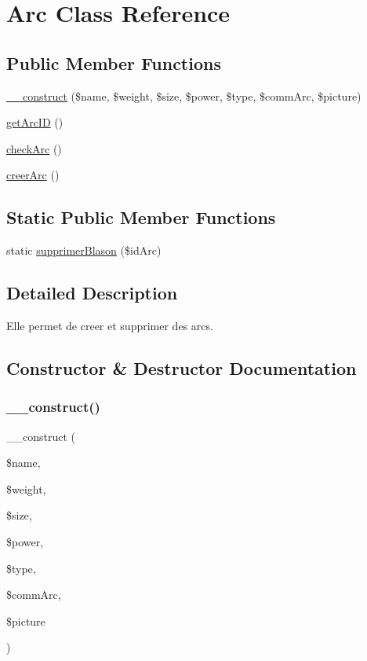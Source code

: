 \hypertarget{class_arc}{}\section{Arc Class Reference}
\label{class_arc}
\subsection*{Public Member Functions}
\begin{DoxyCompactItemize}
\item 
\mbox{\hyperlink{class_arc_a02992e544578742020fbcfd97afeb0b6}{\+\_\+\+\_\+construct}} (\$name, \$weight, \$size, \$power, \$type, \$comm\+Arc, \$picture)
\item 
\mbox{\hyperlink{class_arc_adb077e034d792d322f95da431879663e}{get\+Arc\+ID}} ()
\item 
\mbox{\hyperlink{class_arc_a0019c2ae93221300f87af210da60b6fc}{check\+Arc}} ()
\item 
\mbox{\hyperlink{class_arc_ae135f50876ee1cc311de28351b21fae7}{creer\+Arc}} ()
\end{DoxyCompactItemize}
\subsection*{Static Public Member Functions}
\begin{DoxyCompactItemize}
\item 
static \mbox{\hyperlink{class_arc_a1c954ce573dd0b289d87b655bc80234e}{supprimer\+Blason}} (\$id\+Arc)
\end{DoxyCompactItemize}


\subsection{Detailed Description}
Elle permet de creer et supprimer des arcs. 

\subsection{Constructor \& Destructor Documentation}
\mbox{\label{class_arc_a02992e544578742020fbcfd97afeb0b6}} 
\subsubsection{\texorpdfstring{\+\_\+\+\_\+construct()}{\_\_construct()}}
{\footnotesize\ttfamily \+\_\+\+\_\+construct (\begin{DoxyParamCaption}\item[{}]{\$name,  }\item[{}]{\$weight,  }\item[{}]{\$size,  }\item[{}]{\$power,  }\item[{}]{\$type,  }\item[{}]{\$comm\+Arc,  }\item[{}]{\$picture }\end{DoxyParamCaption})}

